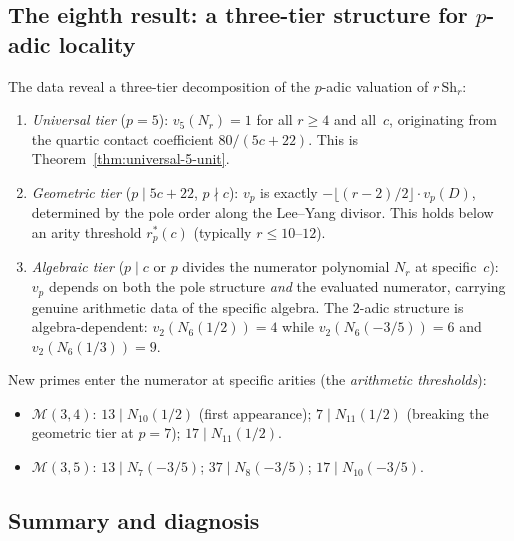 \documentclass[11pt]{article}
\newcommand{\cM}{\mathcal{M}}
\begin{document}
\subsection*{The eighth result: a three-tier structure for
$p$-adic locality}

The data reveal a three-tier decomposition of the $p$-adic
valuation of $r\,\mathrm{Sh}_r$:
\begin{enumerate}[label=(\roman*)]
\item \emph{Universal tier} ($p = 5$): $v_5(N_r) = 1$ for
  all $r \ge 4$ and all~$c$, originating from the quartic
  contact coefficient $80/(5c{+}22)$.  This is
  Theorem~\ref{thm:universal-5-unit}.

\item \emph{Geometric tier} ($p \mid 5c{+}22$,
  $p \nmid c$): $v_p$ is exactly
  $-\lfloor(r{-}2)/2\rfloor \cdot v_p(D)$, determined by
  the pole order along the Lee--Yang divisor.  This holds
  below an arity threshold $r_p^*(c)$ (typically
  $r \le 10$--$12$).

\item \emph{Algebraic tier} ($p \mid c$ or $p$ divides the
  numerator polynomial $N_r$ at specific~$c$): $v_p$ depends
  on both the pole structure \emph{and} the evaluated
  numerator, carrying genuine arithmetic data of the specific
  algebra.  The $2$-adic structure is algebra-dependent:
  $v_2(N_6(1/2)) = 4$ while $v_2(N_6(-3/5)) = 6$ and
  $v_2(N_6(1/3)) = 9$.
\end{enumerate}

New primes enter the numerator at specific arities (the
\emph{arithmetic thresholds}):
\begin{itemize}[leftmargin=1.8em]
\item $\cM(3,4)$: $13 \mid N_{10}(1/2)$ (first appearance);
  $7 \mid N_{11}(1/2)$ (breaking the geometric tier at $p = 7$);
  $17 \mid N_{11}(1/2)$.
\item $\cM(3,5)$: $13 \mid N_7(-3/5)$;
  $37 \mid N_8(-3/5)$; $17 \mid N_{10}(-3/5)$.
\end{itemize}


\subsection*{Summary and diagnosis}
\end{document}
